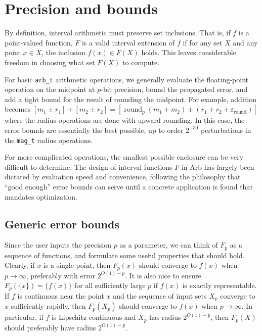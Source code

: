\documentclass[10pt,journal,compsoc,cspaper]{IEEEtran}
\begin{document}
\section{Precision and bounds}

By definition, interval arithmetic must preserve set inclusions. That is,
if $f$ is a point-valued function, $F$ is a valid interval
extension of $f$ if for any set $X$
and any point $x \in X$, the inclusion $f(x) \in F(X)$ holds.
This leaves considerable freedom in choosing what set $F(X)$ to
compute.

For basic \texttt{arb\_t} arithmetic operations, we generally
evaluate the floating-point
operation on the midpoint at $p$-bit precision, bound the propagated
error, and add a tight bound for the result of rounding the midpoint.
For example, addition becomes
$[m_1 \pm r_1] + [m_2 \pm r_2] = [\operatorname{round}_p(m_1 + m_2) \pm (r_1 + r_2 + \varepsilon_{\operatorname{round}})]$
where the radius operations are done with upward rounding.
In this case, the error bounds are essentially the best possible,
up to order $2^{-30}$ perturbations in the \texttt{mag\_t} radius operations.

For more complicated operations, the smallest possible enclosure
can be very difficult to determine. The design
of interval functions $F$ in Arb has largely been dictated by evaluation speed
and convenience, following the philosophy that ``good enough'' error bounds
can serve until a concrete application is found that mandates optimization.

\subsection{Generic error bounds}

\label{sect:generic}

Since the user inputs the precision $p$ as a parameter, we can
think of $F_p$ as a sequence of functions, and formulate
some useful properties that should hold.
Clearly, if $x$ is a single point, then $F_p(x)$ should
converge to $f(x)$ when $p \to \infty$,
preferably with error $2^{O(1)-p}$. It is also nice to
ensure $F_p(\{x\}) = \{f(x)\}$ for all sufficiently
large $p$ if $f(x)$ is exactly representable.
If $f$ is continuous near the point $x$ and
the sequence of input sets $X_p$ converge to $x$ sufficiently rapidly,
then $F_p(X_p)$ should converge to $f(x)$ when $p \to \infty$.
In particular, if $f$ is Lipschitz continuous and $X_p$ has radius $2^{O(1)-p}$,
then $F_p(X)$ should preferably have radius $2^{O(1)-p}$.
\end{document}
